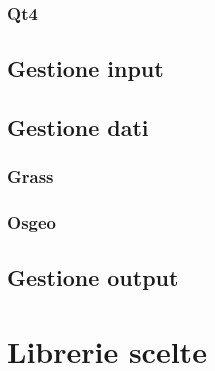 


\subsubsection{Qt4}
\subsection{Gestione input}
\subsection{Gestione dati}
\subsubsection{Grass}
\subsubsection{Osgeo}
\subsection{Gestione output}
\section{Librerie scelte}


